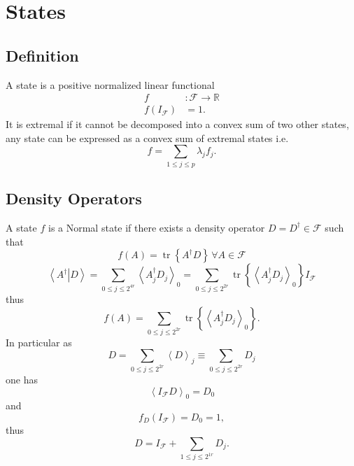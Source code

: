 \documentclass[aps,preprint]{revtex4}%
\begin{document}
\section{States}

\subsection{Definition}

\qquad A state is a positive normalized linear functional
\begin{align}
f  &  :\mathcal{F\rightarrow}\mathbb{R}\\
f\left(  I_{\mathcal{F}}\right)   &  =1.
\end{align}
It is extremal if it cannot be decomposed into a convex sum of two other
states, any state can be expressed as a convex sum of extremal states i.e.
\begin{equation}
f=\sum_{1\leq j\leq p}\lambda_{j}f_{j}.
\end{equation}


\subsection{Density Operators}

A state $f$ is a Normal state if there exists a density operator
$D=D^{\dagger}\in\mathcal{F}$ such that
\begin{equation}
f\left(  A\right)  =\operatorname*{tr}\left\{  A^{\dagger}D\right\}  \,\forall
A\in\mathcal{F}%
\end{equation}%
\begin{equation}
\left\langle \left.  A^{\dagger}\right\vert D\right\rangle =\sum_{0\leq
j\leq2^{4r}}\left\langle A_{j}^{\dagger}D_{j}\right\rangle _{0}=\sum_{0\leq
j\leq2^{2r}}\operatorname*{tr}\left\{  \left\langle A_{j}^{\dagger}%
D_{j}\right\rangle _{0}\right\}  I_{\mathcal{F}}%
\end{equation}
thus
\begin{equation}
f\left(  A\right)  =\sum_{0\leq j\leq2^{2r}}\operatorname*{tr}\left\{
\left\langle A_{j}^{\dagger}D_{j}\right\rangle _{0}\right\}  .
\end{equation}
In particular as
\begin{equation}
D=\sum_{0\leq j\leq2^{2r}}\left\langle D\right\rangle _{j}\equiv\sum_{0\leq
j\leq2^{2r}}D_{j}%
\end{equation}
one has%
\begin{equation}
\left\langle I_{\mathcal{F}}D\right\rangle _{0}=D_{0}%
\end{equation}
and
\begin{equation}
f_{D}\left(  I_{\mathcal{F}}\right)  =D_{0}=1,
\end{equation}
thus
\begin{equation}
D=I_{\mathcal{F}}+\sum_{1\leq j\leq2^{1r}}D_{j}.
\end{equation}
\end{document}
